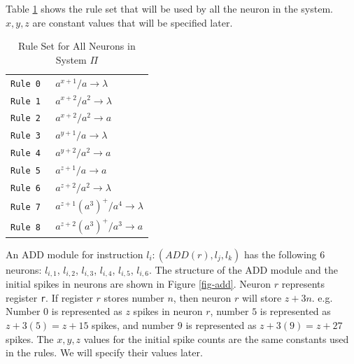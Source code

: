 \documentclass[smallextended]{svjour3}
\begin{document}
Table \ref{table-rules} shows the rule set that will be used by all the neuron in the system. $x,y,z$ are constant values that will be specified
later.

\begin{table}[H]
\begin{center}
\begin{tabular}{|r|l|}
\hline
\tt{Rule 0}  & $a^{x+1}/a          \rightarrow \lambda$  \\ 
\tt{Rule 1}  & $a^{x+2}/a^2        \rightarrow \lambda$  \\ 
\tt{Rule 2}  & $a^{x+2}/a^2        \rightarrow a$        \\ \hline 
\tt{Rule 3}  & $a^{y+1}/a          \rightarrow \lambda$  \\ 
\tt{Rule 4}  & $a^{y+2}/a^2        \rightarrow a$        \\ \hline
\tt{Rule 5}  & $a^{z+1}/a          \rightarrow a$        \\ 
\tt{Rule 6}  & $a^{z+2}/a^2        \rightarrow \lambda$  \\ 
\tt{Rule 7}  & $a^{z+1}(a^3)^+/a^4 \rightarrow \lambda$  \\
\tt{Rule 8}  & $a^{z+2}(a^3)^+/a^3 \rightarrow a$        \\ \hline
\end{tabular}
\end{center}
\caption{Rule Set for All Neurons in System $\Pi$}
\label{table-rules}
\end{table}



An ADD module for instruction $l_i:(ADD(r), l_j, l_k)$ has the following 6 neurons: $l_{i,1}$, $l_{i,2}$, $l_{i,3}$, $l_{i,4}$, $l_{i,5}$, $l_{i,6}$.
The structure of the ADD module and the initial spikes in neurons are shown in Figure \ref{fig-add}. Neuron $r$ represents register \texttt{r}. If 
register $r$ stores number $n$, then neuron $r$ will store $z+3n$. e.g. Number 0 is represented as $z$ spikes in neuron $r$, number $5$ is represented 
as $z+3(5)=z+15$ spikes, and number $9$ is represented as $z+3(9)=z+27$ spikes. The  $x,y,z$ values for the initial spike counts are the same 
constants used in the rules. We will specify their values later.
\end{document}
